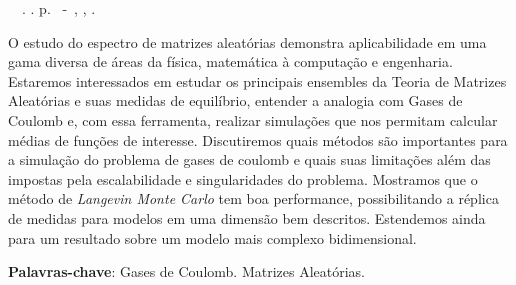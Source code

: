 \setlength{\absparsep}{18pt} %
\begin{resumo}
	\begin{flushleft} 
			\setlength{\absparsep}{0pt} %
			\SingleSpacing 
			\imprimirautorabr~~\textbf{\imprimirtituloresumo}.	\imprimirdata. \pageref{LastPage}p. 
			\imprimirtipotrabalho~-~\imprimirinstituicao, \imprimirlocal, \imprimirdata. 
 	\end{flushleft}
\OnehalfSpacing 	
		
O estudo do espectro de matrizes aleatórias demonstra aplicabilidade em uma gama diversa de áreas da física, matemática à computação e engenharia. Estaremos interessados em estudar os principais ensembles da Teoria de Matrizes Aleatórias e suas medidas de equilíbrio, entender a analogia com Gases de Coulomb e, com essa ferramenta, realizar simulações que nos permitam calcular médias de funções de interesse. Discutiremos quais métodos são importantes para a simulação do problema de gases de coulomb e quais suas limitações além das impostas pela escalabilidade e singularidades do problema. Mostramos que o método de \textit{Langevin Monte Carlo} tem boa performance, possibilitando a réplica de medidas para modelos em uma dimensão bem descritos. Estendemos ainda para um resultado sobre um modelo mais complexo bidimensional.

 \textbf{Palavras-chave}: Gases de Coulomb. Matrizes Aleatórias. 
\end{resumo}